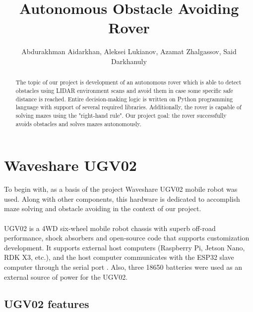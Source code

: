 \documentclass[]{IEEEphot}
\begin{document}
\title{Autonomous Obstacle Avoiding Rover}

\author{Abdurakhman Aidarkhan, Aleksei Lukianov, Azamat Zhalgassov, Said Darkhanuly}


\maketitle


\begin{abstract}
The topic of our project is development of an autonomous rover which is able to detect obstacles using LIDAR environment scans and avoid them in case some specific safe distance is reached. Entire decision-making logic is written on Python programming language with support of several required libraries. Additionally, the rover is capable of solving mazes using the "right-hand rule".
Our project goal: the rover successfully avoids obstacles and solves mazes autonomously.
\end{abstract}


\section{Waveshare UGV02}

To begin with, as a basis of the project Waveshare UGV02 mobile robot was used. Along with other components, this hardware is dedicated to accomplish maze solving and obstacle avoiding in the context of our project.
\\\\
UGV02 is a 4WD six-wheel mobile robot chassis with superb off-road performance, shock absorbers and open-source code that supports customization development. It supports external host computers (Raspberry Pi, Jetson Nano, RDK X3, etc.), and the host computer communicates with the ESP32 slave computer through the serial port \cite{ugv02}. Also, three 18650 batteries were used as an external source of power for the UGV02.    


\subsection{UGV02 features}
\end{document}
